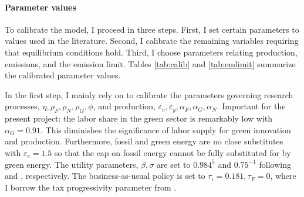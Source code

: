 \paragraph{Parameter values}
To calibrate the model, I proceed in three steps. First, I set certain parameters to values used in the literature. Second, I calibrate the remaining variables requiring that equilibrium conditions hold. Third, I choose parameters relating production, emissions, and the emission limit. Tables \ref{tab:calib} and \ref{tab:emlimit} summarize the calibrated parameter values.

In the first step, I mainly rely on \cite{Fried2018ClimateAnalysis} to calibrate the parameters governing research processes, $\eta, \rho_F,\rho_N, \rho_G, \phi $, and production, $\varepsilon_e, \varepsilon_y, \alpha_F, \alpha_G, \alpha_N$.  Important for the present project: the labor share in the green sector is remarkably low with $\alpha_G=0.91$. This diminishes the significance of labor supply for green innovation and production. Furthermore, fossil and green energy are no close substitutes with $\varepsilon_e=1.5$ so that the cap on fossil energy cannot be fully substituted for by green energy. The utility parameters, $\beta, \sigma$ are set to $0.984^5$ and $0.75^{-1}$ following \cite{Barrage2019OptimalPolicy} and \cite{Chetty2011AreMargins}, respectively. The business-as-usual policy is set to $\tau_\iota=0.181, \tau_F=0$, where I borrow the tax progressivity parameter from \cite{Heathcote2017OptimalFramework}. 

